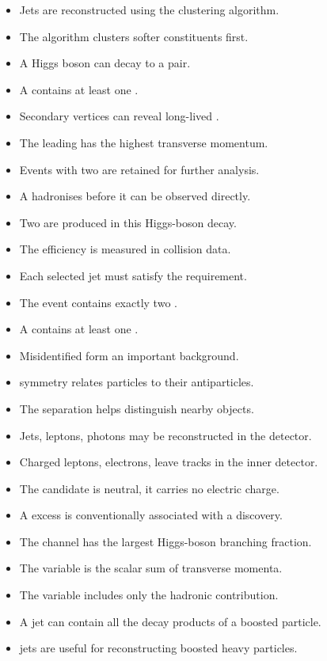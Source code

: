 \begin{itemize}
\item Jets are reconstructed using the \antikt clustering algorithm.
\item The \kt algorithm clusters softer constituents first.
\item A Higgs boson can decay to a \bbbar pair.
\item A \bhadron contains at least one \bquark.
\item Secondary vertices can reveal long-lived \bhadrons.
\item The leading \bjet has the highest transverse momentum.
\item Events with two \bjets are retained for further analysis.
\item A \bquark hadronises before it can be observed directly.
\item Two \bquarks are produced in this Higgs-boson decay.
\item The \btagging efficiency is measured in collision data.
\item Each selected jet must satisfy the \btag requirement.
\item The event contains exactly two \btags.
\item A \chadron contains at least one \cquark.
\item Misidentified \chadrons form an important background.
\item \CPT symmetry relates particles to their antiparticles.
\item The \etaphi separation helps distinguish nearby objects.
\item Jets, leptons, photons \etc may be reconstructed in the detector.
\item Charged leptons, \exampligratia electrons, leave tracks in the inner detector.
\item The candidate is neutral, \idest it carries no electric charge.
\item A \fivesigma excess is conventionally associated with a discovery.
\item The \Hbb channel has the largest Higgs-boson branching fraction.
\item The \HT variable is the scalar sum of transverse momenta.
\item The \HThad variable includes only the hadronic contribution.
\item A \largeR jet can contain all the decay products of a boosted particle.
\item \LargeR jets are useful for reconstructing boosted heavy particles.

\end{itemize}
